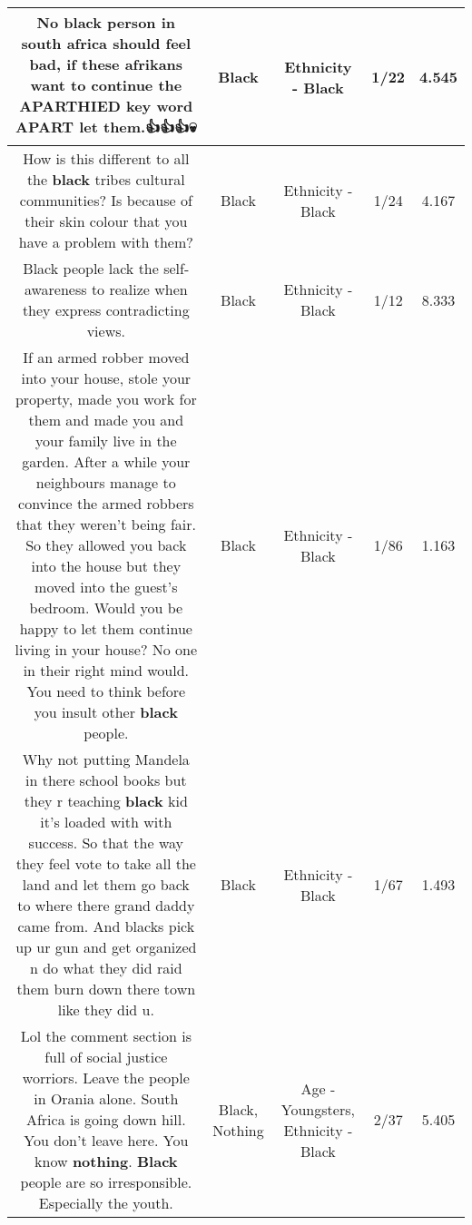 \documentclass[11pt]{article}
\newlength\mylength
\begin{document}
\begin{center}
\begin{longtable}{|C{.65\mylength}|C{.30\mylength}|C{.12\mylength}|C{.12\mylength}|C{.12\mylength}|}
  \small No \textbf{black} person in south africa should feel bad, if these afrikans want to continue the APARTHIED key word APART let them.👍👍👍💀\normalsize   & Black & Ethnicity - Black & 1/22 & 4.545 \\  \hline
  \small How is this different to all the \textbf{black} tribes cultural communities? Is because of their skin colour that you have a problem with them?\normalsize   & Black & Ethnicity - Black & 1/24 & 4.167 \\  \hline
  \small Black people lack the self-awareness to realize when they express contradicting views.\normalsize   & Black & Ethnicity - Black & 1/12 & 8.333 \\  \hline
  \small If an armed robber moved into your house, stole your property, made you work for them and made you and your family live in the garden.  After a while your neighbours manage to convince the armed robbers that they weren't being fair.  So they allowed you back into the house but they moved into the guest's bedroom.  Would you be happy to let them continue living in your house?  No one in their right mind would.  You need to think before you insult other \textbf{black} people.\normalsize   & Black & Ethnicity - Black & 1/86 & 1.163 \\  \hline
  \small Why not putting Mandela in there school books but they r teaching \textbf{black} kid it's loaded with with success. So that the way they feel vote to take all the land and let them go back to where there grand daddy came from. And blacks pick up ur gun and get organized n do what they did raid them burn down there town like they did u.\normalsize   & Black & Ethnicity - Black & 1/67 & 1.493 \\  \hline
  \small Lol the comment section is full of social justice worriors. Leave the people in Orania alone. South Africa is going down hill. You don't leave here. You know \textbf{nothing}. \textbf{Black} people are so irresponsible. Especially the youth.\normalsize   & Black, Nothing & Age - Youngsters, Ethnicity - Black & 2/37 & 5.405 \\  \hline

\end{longtable}
\end{center}
\end{document}
